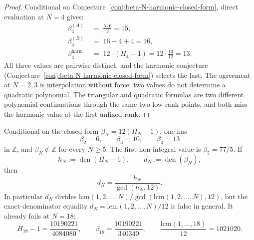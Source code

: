 \begin{proof}
Conditional on Conjecture~\ref{conj:beta-N-harmonic-closed-form},
direct evaluation at $N = 4$ gives:
\begin{align*}
 \beta_4^{(A)} &\;=\; \tfrac{5 \cdot 6}{2} = 15, \\
 \beta_4^{(B)} &\;=\; 16 - 4 + 4 = 16, \\
 \beta_4^{\mathrm{harm}} &\;=\; 12 \cdot (H_4 - 1)
 = 12 \cdot \tfrac{13}{12}
 = 13.
\end{align*}
All three values are pairwise distinct, and the harmonic conjecture
(Conjecture~\ref{conj:beta-N-harmonic-closed-form}) selects
the last. The agreement at $N = 2, 3$ is interpolation without force:
two values do not determine a quadratic polynomial. The triangular and
quadratic formulas are two different polynomial continuations through
the same two low-rank points, and both miss the harmonic value at the
first unfixed rank.
\end{proof}

\begin{corollary}
\label{cor:beta-N-rational-not-integer}
\ClaimStatusConditional
Conditional on the closed form $\beta_N = 12(H_N - 1)$, one has
\[
 \beta_2 = 6,\qquad \beta_3 = 10,\qquad \beta_4 = 13
\]
in $\mathbb Z$, and $\beta_N \notin \mathbb Z$ for every $N\geq 5$.
The first non-integral value is $\beta_5 = 77/5$.  If
\[
 h_N := \operatorname{den}(H_N-1),\qquad
 d_N := \operatorname{den}(\beta_N),
\]
then
\[
 d_N = \frac{h_N}{\gcd(h_N,12)}.
\]
In particular $d_N$ divides
$\mathrm{lcm}(1,2,\ldots,N)/\gcd(\mathrm{lcm}(1,2,\ldots,N),12)$, but
the exact-denominator equality
$d_N=\mathrm{lcm}(1,2,\ldots,N)/12$ is false in general.  It already
fails at $N=18$:
\[
 H_{18}-1=\frac{10190221}{4084080},\qquad
 \beta_{18}=\frac{10190221}{340340},\qquad
 \frac{\mathrm{lcm}(1,\ldots,18)}{12}=1021020.
\]
\end{corollary}

